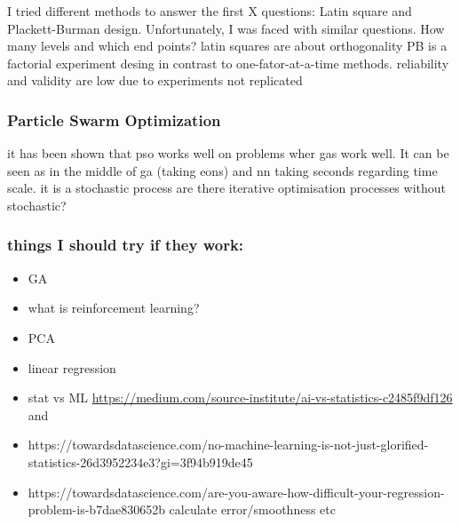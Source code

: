 I tried different methods to answer the first X questions: Latin square and Plackett-Burman design.
Unfortunately, I was faced with similar questions. How many levels and which end points? 
latin squares are about orthogonality 
PB is a factorial experiment desing in contrast to one-fator-at-a-time methods.
reliability and validity are low due to experiments not replicated 

\subsubsection{Particle Swarm Optimization}
it has been shown that \gls{pso} works well on problems wher \gls{ga}s work well\cite{Kennedy1995}. 
It can be seen as in the middle of \gls{ga} (taking eons) and \gls{nn} taking seconds regarding time scale\cite{Kennedy1995}.
it is a stochastic process
are there iterative optimisation processes without stochastic? 
%
\subsubsection{things I should try if they work:}
\begin{itemize}
    \item GA 
    \item what is reinforcement learning? 
    \item PCA
    \item linear regression
    \item stat vs ML \url{https://medium.com/source-institute/ai-vs-statistics-c2485f9df126} and 
    \item https://towardsdatascience.com/no-machine-learning-is-not-just-glorified-statistics-26d3952234e3?gi=3f94b919de45
    \item https://towardsdatascience.com/are-you-aware-how-difficult-your-regression-problem-is-b7dae830652b calculate error/smoothness etc
\end{itemize}


